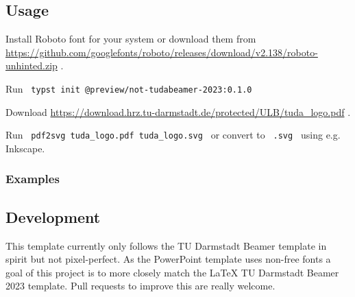 \subsection{Usage}\label{usage}

Install Roboto font for your system or download them from
\url{https://github.com/googlefonts/roboto/releases/download/v2.138/roboto-unhinted.zip}
.

Run \texttt{\ typst\ init\ @preview/not-tudabeamer-2023:0.1.0\ }

Download
\url{https://download.hrz.tu-darmstadt.de/protected/ULB/tuda_logo.pdf} .

Run \texttt{\ pdf2svg\ tuda\_logo.pdf\ tuda\_logo.svg\ } or convert to
\texttt{\ .svg\ } using e.g. Inkscape.

\subsubsection{Examples}\label{examples}

\begin{Shaded}
\begin{Highlighting}[]

\NormalTok{  )}
\NormalTok{)}





\end{Highlighting}
\end{Shaded}

\subsection{Development}\label{development}

This template currently only follows the TU Darmstadt Beamer template in
spirit but not pixel-perfect. As the PowerPoint template uses non-free
fonts a goal of this project is to more closely match the LaTeX TU
Darmstadt Beamer 2023 template. Pull requests to improve this are really
welcome.

